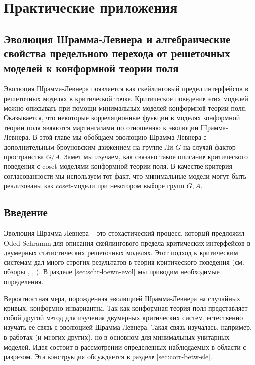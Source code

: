 \chapter{Практические приложения}
\label{cha:applications}

\section{Эволюция Шрамма-Левнера и алгебраические свойства предельного перехода от решеточных моделей к конформной теории поля}
\label{sec:SLE}

Эволюция Шрамма-Левнера появляется как скейлинговый предел интерфейсов в решеточных моделях в критической точке. Критическое поведение этих моделей можно описывать при помощи минимальных моделей конформной теории поля. Оказывается, что некоторые корреляционные функции в моделях конформной теории поля являются мартингалами по отношению к эволюции Шрамма-Левнера. 
В этой главе мы обобщаем эволюцию Шрамма-Левнера с дополнительным броуновским движением на группе Ли  $G$ на случай фактор-пространства $G/A$. Замет мы изучаем, как связано такое описание критического поведения с coset-моделями конформной теории поля. В качестве критерия согласованности мы используем тот факт, что минимальные модели могут быть реализованы как coset-модели при некотором выборе групп $G, A$.

\section{Введение}
Эволюция Шрамма-Левнера -- это стохастический процесс, который предложил Oded Schramm  \cite{schramm2000scaling} для описания скейлингового предела критических интерфейсов в двумерных статистических решеточных моделях. Этот подход к критическим системам дал много строгих результатов в теории критического поведения (см. обзоры  \cite{rohde2005basic}, \cite{bauer20062d}, \cite{Cardy:2005kh}). В разделе \ref{sec:schr-loewn-evol} мы приводим необходимые определения.  

Вероятностная мера, порожденная эволюцией Шрамма-Левнера на случайных кривых, конформно-инвариантна. Так как конформная теория поля представляет собой другой метод для изучения двумерных критических систем, естественно изучать ее связь с эволюцией Шрамма-Левнера. Такая связь изучалась, например, в работах \cite{bauer2004conformal,bauer2004cfts,bauer2003sle,bauer2002sle} (и многих других), но в основном для минимальных унитарных моделей. 
Идея состоит в рассмотрении определенных наблюдаемых в области с разрезом. Эта конструкция обсуждается в разделе \ref{sec:corr-betw-sle}. 

